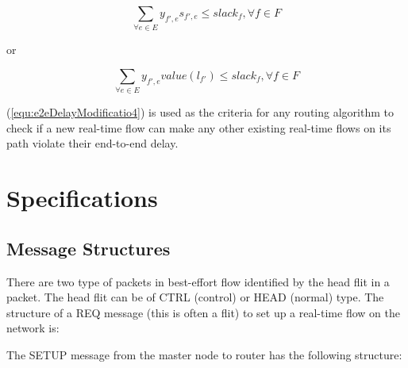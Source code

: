 \documentclass[conference, twocolumn]{IEEEtran}
\theoremstyle{definition}
\begin{document}
\begin{equation}\label{equ:e2eDelayModificatio3}
\sum_{\forall e \in E}y_{f',e}s_{f',e} \leq slack_f, \forall f \in F
\end{equation}

or

\begin{equation}\label{equ:e2eDelayModificatio4}
\sum_{\forall e \in E}y_{f',e}value(l_{f'}) \leq slack_f, \forall f \in F
\end{equation}

(\ref{equ:e2eDelayModificatio4}) is used as the criteria for any routing
algorithm to check if a new real-time flow can make any other existing
real-time flows on its path violate their end-to-end delay.

\section{Specifications}
\subsection{Message Structures}

There are two type of packets in best-effort flow identified by the head flit
in a packet. The head flit can be of CTRL (control) or HEAD (normal) type. The
structure of a REQ message (this is often a flit) to set up a real-time flow on the network is:

\begin{table}[htbp]
\begin{center}
\end{center}
\caption{REQ path message}
\label{table:PathMsg}
\end{table}

The SETUP message from the master node to router has the following structure:

\begin{table}[htbp]
\begin{center}
\end{center}
\caption{SETUP path message}
\label{table:PathMsg}
\end{table}
\end{document}
